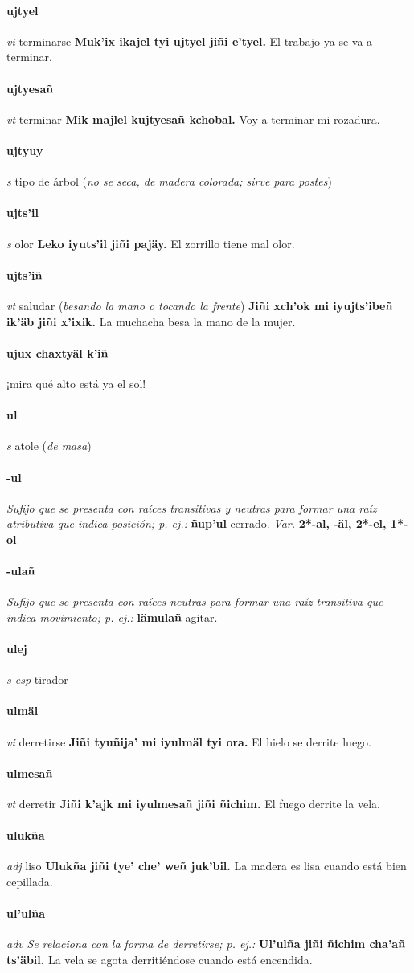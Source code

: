 \documentclass{scrbook}
\newcommand{\entry}[1]{\paragraph{#1}}
\newcommand{\nontranslationdef}[1]{\textit{#1}}
\newcommand{\partofspeech}[1]{\textit{#1}}
\newcommand{\spanishtranslation}[1]{#1}
\newcommand{\clarification}[1]{(\textit{#1})}
\newcommand{\cholexample}[1]{\textbf{#1}}
\newcommand{\exampletranslation}[1]{#1}
\newcommand{\variation}[1]{\textit{Var.} \textbf{#1}}
\begin{document}
\begin{multicols}{2}
\entry{ujtyel}
\partofspeech{vi}
\spanishtranslation{terminarse}
\cholexample{Muk'ix ikajel tyi ujtyel jiñi e'tyel.}
\exampletranslation{El trabajo ya se va a terminar.}

\entry{ujtyesañ}
\partofspeech{vt}
\spanishtranslation{terminar}
\cholexample{Mik majlel kujtyesañ kchobal.}
\exampletranslation{Voy a terminar mi rozadura.}

\entry{ujtyuy}
\partofspeech{s}
\spanishtranslation{tipo de árbol}
\clarification{no se seca, de madera colorada; sirve para postes}

\entry{ujts'il}
\partofspeech{s}
\spanishtranslation{olor}
\cholexample{Leko iyuts'il jiñi pajäy.}
\exampletranslation{El zorrillo tiene mal olor.}

\entry{ujts'iñ}
\partofspeech{vt}
\spanishtranslation{saludar}
\clarification{besando la mano o tocando la frente}
\cholexample{Jiñi xch'ok mi iyujts'ibeñ ik'äb jiñi x'ixik.}
\exampletranslation{La muchacha besa la mano de la mujer.}

\entry{ujux chaxtyäl k'iñ}
\spanishtranslation{¡mira qué alto está ya el sol!}

\entry{ul}
\partofspeech{s}
\spanishtranslation{atole}
\clarification{de masa}

\entry{-ul}
\nontranslationdef{Sufijo que se presenta con raíces transitivas y neutras para formar una raíz atributiva que indica posición; p. ej.:}
\cholexample{ñup'ul}
\exampletranslation{cerrado.}
\variation{2*-al, -äl, 2*-el, 1*-ol}

\entry{-ulañ}
\nontranslationdef{Sufijo que se presenta con raíces neutras para formar una raíz transitiva que indica movimiento; p. ej.:}
\cholexample{lämulañ}
\exampletranslation{agitar.}

\entry{ulej}
\partofspeech{s esp}
\spanishtranslation{tirador}

\entry{ulmäl}
\partofspeech{vi}
\spanishtranslation{derretirse}
\cholexample{Jiñi tyuñija' mi iyulmäl tyi ora.}
\exampletranslation{El hielo se derrite luego.}

\entry{ulmesañ}
\partofspeech{vt}
\spanishtranslation{derretir}
\cholexample{Jiñi k'ajk mi iyulmesañ jiñi ñichim.}
\exampletranslation{El fuego derrite la vela.}

\entry{ulukña}
\partofspeech{adj}
\spanishtranslation{liso}
\cholexample{Ulukña jiñi tye' che' weñ juk'bil.}
\exampletranslation{La madera es lisa cuando está bien cepillada.}

\entry{ul'ulña}
\partofspeech{adv}
\nontranslationdef{Se relaciona con la forma de derretirse; p. ej.:}
\cholexample{Ul'ulña jiñi ñichim cha'añ ts'äbil.}
\exampletranslation{La vela se agota derritiéndose cuando está encendida.}


\end{multicols}
\end{document}
